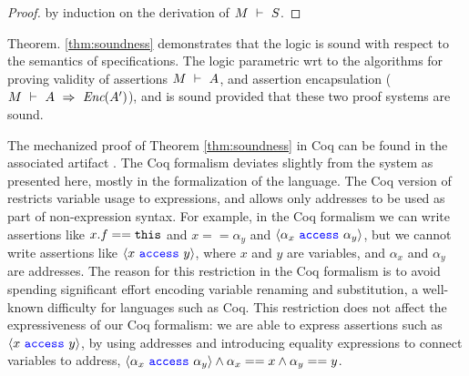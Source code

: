 \begin{proof}
by induction on the derivation of $M\ \vdash\ S$.
\end{proof}

Theorem. \ref{thm:soundness} demonstrates 
 that the   \Nec logic is sound with respect to the semantics of \Nec specifications.
 The \Nec logic parametric wrt to the algorithms for proving validity of assertions
 $M\ \vdash\ A$, and 
 assertion encapsulation ($M\ \vdash\ A\ \Rightarrow\ \textit{Enc}(A')$), and is sound
 provided that these two proof systems are sound.



The mechanized  proof of Theorem \ref{thm:soundness} in Coq 
can be found in the associated artifact \cite{necessityCoq2022}. 
The   Coq formalism deviates slightly from the system as
presented here,  mostly in the formalization of the 
\SpecO language. The Coq version of \SpecO restricts variable usage to expressions, and allows only addresses to 
be used as part of non-expression syntax. 
For example, in the Coq formalism
we can write assertions like $x.f=={\texttt{this}}$ and
$x==\alpha_y$ and  $\langle \alpha_x\ {\color{blue}\texttt{access}}\ \alpha_y \rangle$, but we cannot write assertions 
like $\langle x\ {\color{blue}\texttt{access}}\ y \rangle$, where $x$ and $y$ are variables, and $\alpha_x$ and $\alpha_y$ are
addresses.
The reason for this restriction in the Coq formalism is to avoid spending %
significant effort encoding variable
renaming and substitution, a well-known difficulty for languages such as Coq. 
This restriction does not affect the expressiveness of %
our  Coq formalism: we are
able to express assertions such as $\langle x\ {\color{blue}\texttt{access}}\ y \rangle$, by using addresses and introducing equality expressions %
to connect variables to address, \ie
 $\langle \alpha_x\ {\color{blue}\texttt{access}}\ \alpha_y \rangle \wedge \alpha_x == x \wedge \alpha_y == y$.
